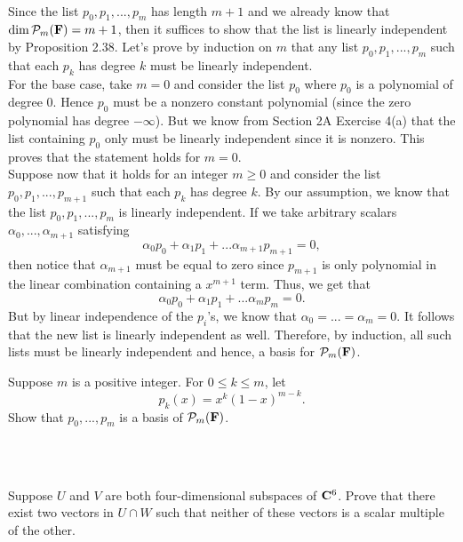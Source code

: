 \begin{solution}
    \\ Since the list $p_0,p_1, ..., p_m$ has length $m+1$ and we already know that $\dim \mathcal{P}_m(\mathbf{F}) = m+1$, then it suffices to show that the list is linearly independent by Proposition 2.38. Let's prove by induction on $m$ that any list $p_0, p_1, ..., p_m$ such that each $p_k$ has degree $k$ must be linearly independent. \\
    For the base case, take $m = 0$ and consider the list $p_0$ where $p_0$ is a polynomial of degree $0$. Hence $p_0$ must be a nonzero constant polynomial (since the zero polynomial has degree $-\infty$). But we know from Section 2A Exercise 4(a) that the list containing $p_0$ only must be linearly independent since it is nonzero. This proves that the statement holds for $m=0$. \\
    Suppose now that it holds for an integer $m \geq 0$ and consider the list $p_0, p_1, ..., p_{m+1}$ such that each $p_k$ has degree $k$. By our assumption, we know that the list $p_0, p_1, ..., p_m$ is linearly independent. If we take arbitrary scalars $\alpha_0, ..., \alpha_{m+1}$ satisfying
    $$\alpha_0 p_0 + \alpha_1 p_1 + ... \alpha_{m+1} p_{m+1} = 0,$$
    then notice that $\alpha_{m+1}$ must be equal to zero since $p_{m+1}$ is only polynomial in the linear combination containing a $x^{m+1}$ term. Thus, we get that
    $$\alpha_0 p_0 + \alpha_1 p_1 + ... \alpha_m p_m = 0.$$
    But by linear independence of the $p_i$'s, we know that $\alpha_0 = ... = \alpha_m = 0$. It follows that the new list is linearly independent as well. Therefore, by induction, all such lists must be linearly independent and hence, a basis for $\mathcal{P}_m(\mathbf{F})$.\\ 
\end{solution}

\begin{exercise}
    Suppose $m$ is a positive integer. For $0 \leq k \leq m$, let 
    $$p_k(x) = x^k(1-x)^{m-k}.$$
    Show that $p_0, ..., p_m$ is a basis of $\mathcal{P}_m(\mathbf{F})$.\\
\end{exercise}

\begin{solution}
    \\ \td \\
\end{solution}

\begin{exercise}
    Suppose $U$ and $V$ are both four-dimensional subspaces of $\mathbf{C}^6$. Prove that there exist two vectors in $U \cap W$ such that neither of these vectors is a scalar multiple of the other. \\
\end{exercise}

\begin{solution}
    \\ \td \\
\end{solution}